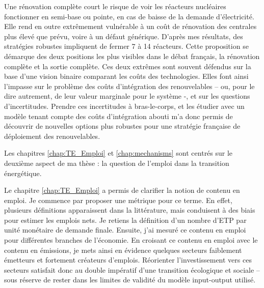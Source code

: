 Une rénovation complète court le risque de voir les réacteurs nucléaires fonctionner en semi-base ou pointe, en cas de baisse de la demande d’électricité. Elle rend en outre extrêmement vulnérable à un coût de rénovation des centrales plus élevé que prévu, voire à un défaut générique. 
D’après mes résultats, des stratégies robustes impliquent de fermer 7 à 14 réacteurs. Cette proposition se démarque des deux positions les plus visibles dans le débat français, la rénovation complète et la sortie complète. Ces deux extrêmes sont souvent défendus sur la base d’une vision binaire comparant les coûts des technologies. Elles font ainsi l’impasse sur le problème des coûts d’intégration des renouvelables – ou, pour le dire autrement, de leur valeur marginale pour le système -, et sur les questions d’incertitudes. 
Prendre ces incertitudes à bras-le-corps, et les étudier avec un modèle tenant compte des coûts d’intégration abouti m’a donc permis de découvrir de nouvelles options plus robustes pour une stratégie française de déploiement des renouvelables.



Les chapitres \ref{chap:TE_Emploi} et \ref{chap:mechanisms} sont centrés sur le deuxième aspect de ma thèse : la question de l’emploi dans la transition énergétique.

Le chapitre \ref{chap:TE_Emploi} a permis de clarifier la notion de contenu en emploi.  Je commence par proposer une métrique pour ce terme. En effet, plusieurs définitions apparaissent dans la littérature, mais conduisent à des biais pour estimer les emplois nets. Je retiens la définition d’un nombre d’ETP par unité monétaire de demande finale.
Ensuite, j’ai mesuré ce contenu en emploi pour différentes branches de l’économie. En croisant ce contenu en emploi avec le contenu en émissions, je mets ainsi en évidence quelques secteurs faiblement émetteurs et fortement créateurs d’emplois. Réorienter l’investissement vers ces secteurs satisfait donc au double impératif d’une transition écologique et sociale – sous réserve de rester dans les limites de validité du modèle input-output utilisé.

